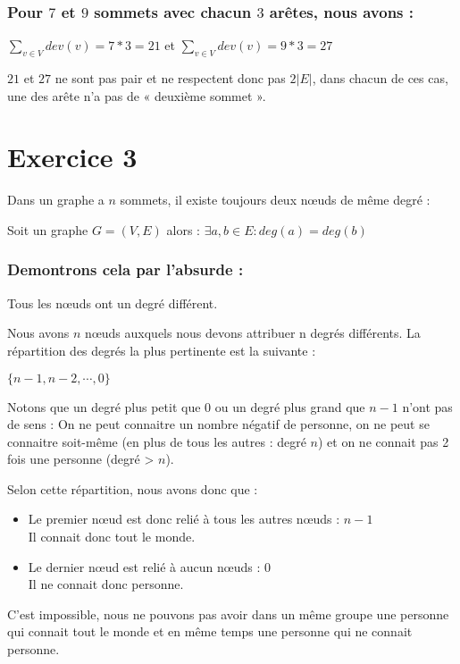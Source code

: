 \documentclass[fontsize=10pt]{article}
\begin{document}
\subsubsection*{Pour $7$ et $9$ sommets avec chacun $3$ arêtes, nous avons :}

{\centering $\displaystyle\sum_{v \in V} dev(v) = 7 * 3 = 21$ et $\displaystyle\sum_{v \in V} dev(v) = 9 * 3 = 27$ }

$21$ et $27$ ne sont pas pair et ne respectent donc pas $2 |E|$, dans chacun de ces cas, une des arête n'a pas de « deuxième sommet ».

\section*{Exercice 3}
    Dans un graphe a $n$ sommets, il existe toujours deux nœuds de même degré :

    Soit un graphe $G = (V, E)$ alors : $\exists a, b \in E : deg(a) = deg(b)$

\subsubsection*{Demontrons cela par l'absurde :}
Tous les nœuds ont un degré différent.

Nous avons $n$ nœuds auxquels nous devons attribuer n degrés différents.
La répartition des degrés la plus pertinente est la suivante :

$\{ n - 1, n - 2, \cdots, 0\}$

Notons que un degré plus petit que $0$ ou un degré plus grand que $n - 1$ n'ont pas de sens : On ne peut connaitre un nombre négatif de personne, on ne peut se connaitre soit-même (en plus de tous les autres : degré $n$) et on ne connait pas 2 fois une personne (degré > $n$).

Selon cette répartition, nous avons donc que :
\begin{itemize}
    \itemsep0em
    \item Le premier nœud est donc relié à tous les autres nœuds : $n - 1$\\
        Il connait donc tout le monde.
    \item Le dernier nœud est relié à aucun nœuds : $0$\\
        Il ne connait donc personne.
\end{itemize}
C'est impossible, nous ne pouvons pas avoir dans un même groupe une personne
qui connait tout le monde et en même temps une personne qui ne connait
personne.
\end{document}
